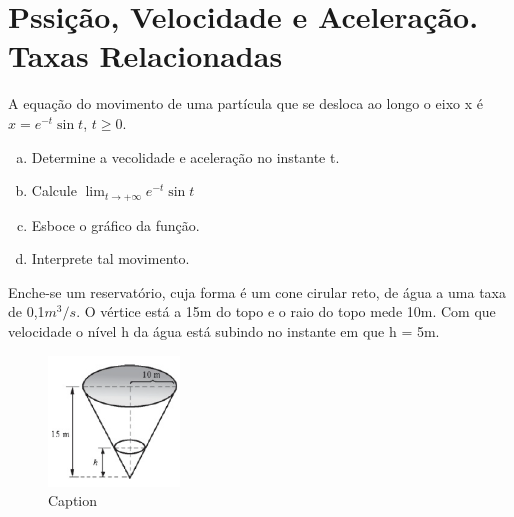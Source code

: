 \documentclass[12pt]{exam}
\begin{document}
\section{Pssição, Velocidade e Aceleração. Taxas Relacionadas}

\begin{questions}

\question A equação do movimento de uma partícula que se desloca ao longo o eixo x é $x = e^{-t}\sin{t}$, $t \geq 0$.
    \begin{multicols}{2}
        \begin{enumerate}[(a)]
            \item 
            Determine a vecolidade e aceleração no instante t.
            \item 
             Calcule $\displaystyle \lim_{t \to +\infty}  e^{-t}\sin{t} $
            \item 
            Esboce o gráfico da função.
            \item 
            Interprete tal movimento.
        \end{enumerate}
    \end{multicols}

\question Enche-se um reservatório, cuja forma é um cone cirular reto, de água a uma taxa de 0,1$m^3/s$. O vértice está a 15m do topo e o raio do topo mede 10m. Com que velocidade o nível h da água está subindo no instante em que h = 5m.

\begin{figure}[h]
    \centering
    \includegraphics[width=3.5cm]{Screenshot_2.png}
    \caption{Caption}
    \label{fig:enter-label}
\end{figure}


\end{questions}
\end{document}

